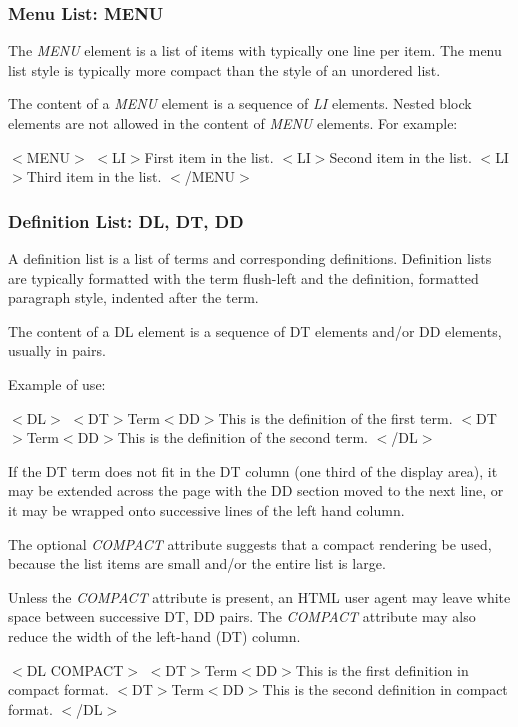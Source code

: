 \subsubsection*{Menu List:  MENU}\par 
The {\it MENU} element is a list of items with typically one line
per item.  The menu list style is typically more compact than the style
of an unordered list.
\par \par 
The content of a {\it MENU} element is a sequence of {\it LI}
elements.  Nested block elements are not allowed in the content of
{\it MENU} elements.  For example:
\par $<$MENU$>$
$<$LI$>$First item in the list.
$<$LI$>$Second item in the list.
$<$LI$>$Third item in the list.
$<$/MENU$>$
\subsubsection*{Definition List:  DL, DT, DD}\par 
A definition list is a list of terms and corresponding
definitions.  Definition lists are typically formatted with the term
flush-left and the definition, formatted paragraph style, indented
after the term.
\par \par 
The content of a DL element is a sequence of DT elements and/or DD
elements, usually in pairs.
\par \par 
Example of use:
\par $<$DL$>$
$<$DT$>$Term$<$DD$>$This is the definition of the first term.
$<$DT$>$Term$<$DD$>$This is the definition of the second term.
$<$/DL$>$
\par 
If the DT term does not fit in the DT column (one third of the
display area), it may be extended across the page with the DD section
moved to the next line, or it may be wrapped onto successive lines of
the left hand column.
\par \par 
The optional {\it COMPACT} attribute suggests that a compact
rendering be used, because the list items are small and/or the entire
list is large.
\par \par 
Unless the {\it COMPACT} attribute is present, an HTML user agent
may leave white space between successive DT, DD pairs.  The
{\it COMPACT} attribute may also reduce the width of the left-hand
(DT) column.
\par $<$DL COMPACT$>$
$<$DT$>$Term$<$DD$>$This is the first definition in compact format.
$<$DT$>$Term$<$DD$>$This is the second definition in compact format.
$<$/DL$>$
